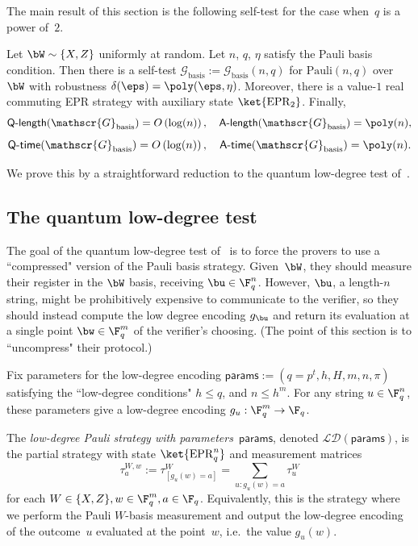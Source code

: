 \documentclass[11pt]{article}
\newcommand{\params}{\mathsf{params}}
\newcommand{\game}{\mathscr{G}}
\newcommand{\qtime}[1]{\mathsf{Q}\textnormal{-}\mathsf{time}(#1)}
\newcommand{\atime}[1]{\mathsf{A}\textnormal{-}\mathsf{time}(#1)}
\newcommand{\qlength}[1]{\mathsf{Q}\textnormal{-}\mathsf{length}(#1)}
\newcommand{\alength}[1]{\mathsf{A}\textnormal{-}\mathsf{length}(#1)}
\newcommand{\paulistrat}[2]{\mathrm{Pauli}(#1,#2)}
\begin{document}
The main result of this section is the following self-test for the case when~$q$ is a power of~$2$.

\begin{theorem}\label{thm:basis-test}
Let $\bW \sim \{X, Z\}$ uniformly at random.  Let $n$, $q$, $\eta$ satisfy the Pauli basis condition.
Then there is a self-test $\game_{\mathrm{basis}} := \game_{\mathrm{basis}}(n,q)$ for $\paulistrat{n}{q}$ over~$\bW$
with robustness $\delta(\eps) = \poly(\eps, \eta)$.
Moreover, there is a value-$1$ real commuting EPR strategy with auxiliary state $\ket{\mathrm{EPR}_2}$.
Finally,
\begin{equation*}
\qlength{\game_{\mathrm{basis}}} = O\left(\log(n)\right),
\quad
\alength{\game_{\mathrm{basis}}} = \poly(n),
\end{equation*}
\begin{equation*}
\qtime{\game_{\mathrm{basis}}} = O\left(\log(n)\right),
\quad
\atime{\game_{\mathrm{basis}}} = \poly(n).
\end{equation*}
\end{theorem}

We prove this by a straightforward reduction to the quantum low-degree test of~\cite{NV18a}.

\subsection{The quantum low-degree test}

The goal of the quantum low-degree test of~\cite{NV18a}
is to force the provers to use a ``compressed" version of the Pauli basis strategy.
Given~$\bW$, they should measure their register in the $\bW$ basis, receiving $\bu \in \F_q^n$.
However, $\bu$, a length-$n$ string, might be prohibitively expensive to communicate to the verifier,
so they should instead compute the low degree encoding $g_{\bu}$
and return its evaluation at a single point $\bw \in \F_q^m$ of the verifier's choosing.
(The point of this section is to ``uncompress" their protocol.)

\begin{definition}
Fix parameters for the low-degree encoding $\params := (q = p^t, h, H, m, n, \pi)$
satisfying the ``low-degree conditions"
$h \leq q$, and $n \leq h^m$.
For any string $u \in \F_q^n$,
these parameters give a low-degree encoding $g_u:\F_q^m \rightarrow \F_q$.

The \emph{low-degree Pauli strategy with parameters~$\params$},
denoted $\mathcal{LD}(\params)$, is the partial strategy
with state $\ket{\mathrm{EPR}^n_q}$ and measurement matrices
\begin{equation*}
\tau^{W, w}_a :=
\tau^{W}_{[g_u(w) = a]} =
\sum_{u : g_u(w) = a} \tau^W_u
\end{equation*}
for each $W \in \{X, Z\}, w \in \F_q^m, a \in \F_q$.
Equivalently, this is the strategy where we perform the Pauli $W$-basis measurement
and output the low-degree encoding of the outcome~$u$ evaluated at the point~$w$, i.e.\ the value $g_u(w)$.
\end{definition}
\end{document}
